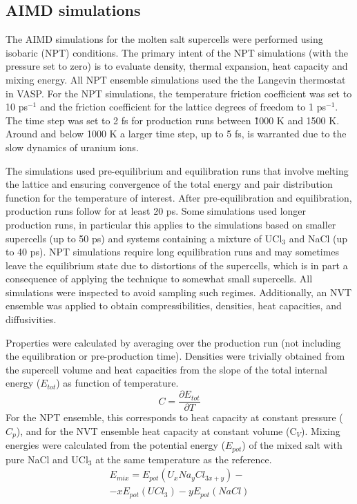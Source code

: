 \documentclass[preprint,3p,10pt,onecolumn,number,sort&compress]{elsarticle}
\begin{document}
\subsection{AIMD simulations}
The AIMD simulations for the molten salt supercells were performed using isobaric (NPT) conditions. The primary intent of the NPT simulations (with the pressure set to zero) is to evaluate density, thermal expansion, heat capacity and mixing energy. All NPT ensemble simulations used the the Langevin thermostat in VASP. For the NPT simulations, the temperature friction coefficient was set to 10 ps$^{-1}$ and the friction coefficient for the lattice degrees of freedom to 1 ps$^{-1}$. The time step was set to 2 fs for production runs between \~1000 K and 1500 K. Around and below 1000 K a larger time step, up to 5 fs, is warranted due to the slow dynamics of uranium ions.

The simulations used pre-equilibrium and equilibration runs that involve melting the lattice and ensuring convergence of the total energy and pair distribution function for the temperature of interest. After pre-equilibration and equilibration, production runs follow for at least 20 ps. Some simulations used longer production runs, in particular this applies to the simulations based on smaller supercells (up to 50 ps) and systems containing a mixture of UCl$_3$ and NaCl (up to 40 ps). NPT simulations require long equilibration runs and may sometimes leave the equilibrium state due to distortions of the supercells, which is in part a consequence of applying the technique to somewhat small supercells. All simulations were inspected to avoid sampling such regimes. Additionally, an NVT ensemble was applied to obtain compressibilities, densities, heat capacities, and diffusivities. 

Properties were calculated by averaging over the production run (not including the equilibration or pre-production time). Densities were trivially obtained from the supercell volume and heat capacities from the slope of the total internal energy ($E_{tot}$) as function of temperature. 
\begin{equation}
C=\frac{\partial E_{tot}}{\partial T}
\end{equation}
For the NPT ensemble, this corresponds to heat capacity at constant pressure ($C_p$), and for the NVT ensemble heat capacity at constant volume (C$_V$). Mixing energies were calculated from the potential energy ($E_{pot}$) of the mixed salt with pure NaCl and UCl$_3$ at the same temperature as the reference. 
\begin{equation}
\begin{split}
E_{mix}=E_{pot}(U_xNa_yCl_{3x+y})- \\
-xE_{pot}(UCl_3)-yE_{pot}(NaCl)
\end{split}
\end{equation}
\end{document}
